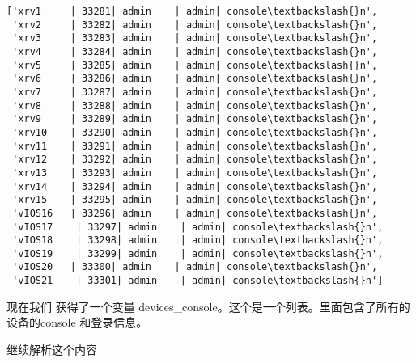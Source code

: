 \documentclass[11pt]{article}
\begin{document}
    \begin{Verbatim}[commandchars=\\\{\}]
['xrv1     | 33281| admin    | admin| console\textbackslash{}n',
 'xrv2     | 33282| admin    | admin| console\textbackslash{}n',
 'xrv3     | 33283| admin    | admin| console\textbackslash{}n',
 'xrv4     | 33284| admin    | admin| console\textbackslash{}n',
 'xrv5     | 33285| admin    | admin| console\textbackslash{}n',
 'xrv6     | 33286| admin    | admin| console\textbackslash{}n',
 'xrv7     | 33287| admin    | admin| console\textbackslash{}n',
 'xrv8     | 33288| admin    | admin| console\textbackslash{}n',
 'xrv9     | 33289| admin    | admin| console\textbackslash{}n',
 'xrv10    | 33290| admin    | admin| console\textbackslash{}n',
 'xrv11    | 33291| admin    | admin| console\textbackslash{}n',
 'xrv12    | 33292| admin    | admin| console\textbackslash{}n',
 'xrv13    | 33293| admin    | admin| console\textbackslash{}n',
 'xrv14    | 33294| admin    | admin| console\textbackslash{}n',
 'xrv15    | 33295| admin    | admin| console\textbackslash{}n',
 'vIOS16   | 33296| admin    | admin| console\textbackslash{}n',
 'vIOS17    | 33297| admin    | admin| console\textbackslash{}n',
 'vIOS18    | 33298| admin    | admin| console\textbackslash{}n',
 'vIOS19    | 33299| admin    | admin| console\textbackslash{}n',
 'vIOS20   | 33300| admin    | admin| console\textbackslash{}n',
 'vIOS21    | 33301| admin    | admin| console\textbackslash{}n']

    \end{Verbatim}

    现在我们 获得了一个变量
devices\_console。这个是一个列表。里面包含了所有的设备的console
和登录信息。

继续解析这个内容
\end{document}
